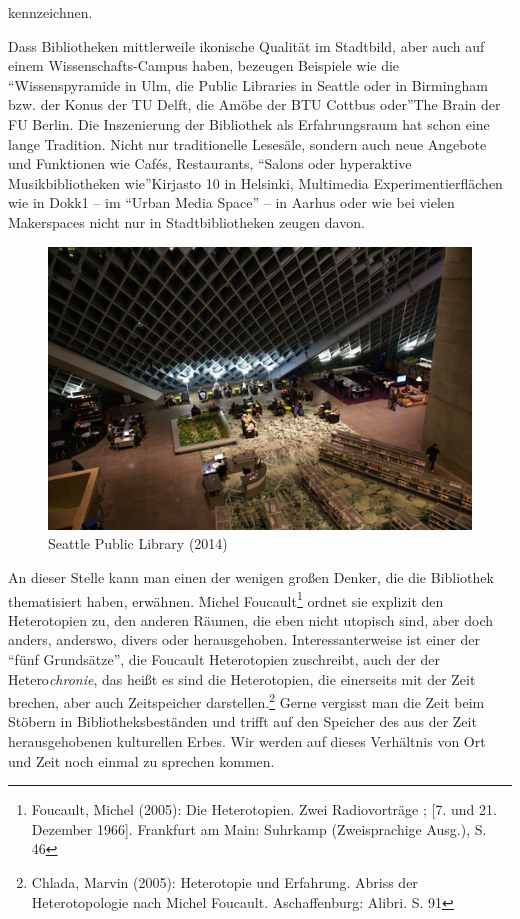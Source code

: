 kennzeichnen.

Dass Bibliotheken mittlerweile ikonische Qualität im Stadtbild, aber
auch auf einem Wissenschafts-Campus haben, bezeugen Beispiele wie die
\enquote{Wissenspyramide in Ulm, die Public Libraries in Seattle oder in
Birmingham bzw. der Konus der TU Delft, die Amöbe der BTU Cottbus
oder}The Brain der FU Berlin. Die Inszenierung der Bibliothek als
Erfahrungsraum hat schon eine lange Tradition. Nicht nur traditionelle
Lesesäle, sondern auch neue Angebote und Funktionen wie Cafés,
Restaurants, \enquote{Salons oder hyperaktive Musikbibliotheken
wie}Kirjasto 10 in Helsinki, Multimedia Experimentierflächen wie in
Dokk1 -- im \enquote{Urban Media Space} -- in Aarhus oder wie bei vielen
Makerspaces nicht nur in Stadtbibliotheken zeugen davon.

\begin{figure}[htbp]
\centering
\includegraphics{img/hobohm-1.jpg}
\caption{Seattle Public Library (2014)}
\end{figure}

An dieser Stelle kann man einen der wenigen großen Denker, die die
Bibliothek thematisiert haben, erwähnen. Michel Foucault\footnote{Foucault,
  Michel (2005): Die Heterotopien. Zwei Radiovorträge ; {[}7. und 21.
  Dezember 1966{]}. Frankfurt am Main: Suhrkamp (Zweisprachige Ausg.),
  S. 46} ordnet sie explizit den Heterotopien zu, den anderen Räumen,
die eben nicht utopisch sind, aber doch anders, anderswo, divers oder
herausgehoben. Interessanterweise ist einer der \enquote{fünf Grundsätze}, die
Foucault Heterotopien zuschreibt, auch der der Hetero\emph{chronie}, das
heißt es sind die Heterotopien, die einerseits mit der Zeit brechen,
aber auch Zeitspeicher darstellen.\footnote{Chlada, Marvin (2005):
  Heterotopie und Erfahrung. Abriss der Heterotopologie nach Michel
  Foucault. Aschaffenburg: Alibri. S. 91} Gerne vergisst man die Zeit
beim Stöbern in Bibliotheksbeständen und trifft auf den Speicher des aus
der Zeit herausgehobenen kulturellen Erbes. Wir werden auf dieses
Verhältnis von Ort und Zeit noch einmal zu sprechen kommen.

